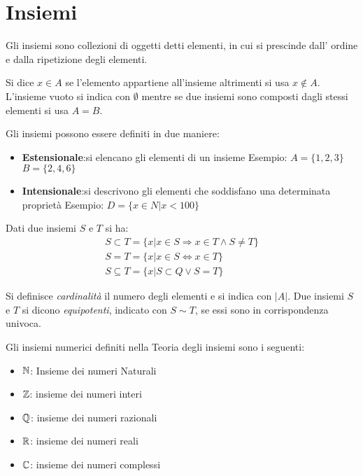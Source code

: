 \chapter{Insiemi}
Gli insiemi sono collezioni di oggetti detti elementi, in cui si prescinde dall'
ordine e dalla ripetizione degli elementi.

Si dice $x \in A$ se l'elemento appartiene all'insieme altrimenti si usa $x \not \in A$.
L'insieme vuoto si indica con $\emptyset$ mentre se due insiemi sono composti dagli stessi
elementi si usa $A = B$.

Gli insiemi possono essere definiti in due maniere:

\begin{itemize}
  \item \textbf{Estensionale}:si elencano gli elementi di un insieme\newline
        Esempio:\newline
        $A = \{1,2,3\}$\newline
        $B = \{2,4,6\}$\newline
  \item \textbf{Intensionale}:si descrivono gli elementi che soddisfano una determinata proprietà\newline
        Esempio: \newline
        $D = \{x \in N | x < 100\}$
\end{itemize}

Dati due insiemi $S$ e $T$ si ha:
\begin{align*}
  S \subset T = \{x | x \in S \Rightarrow x \in T \land S \not = T \} \\
  S = T  = \{x | x \in S \iff x \in T \} \\
  S \subseteq T = \{x | S \subset Q \lor S = T \}
\end{align*}


Si definisce \textit{cardinalità} il numero degli elementi e si indica con $|A|$.\newline
Due insiemi $S$ e $T$ si dicono \textit{equipotenti}, indicato con $S \sim T$, se
essi sono in corrispondenza univoca.

Gli insiemi numerici definiti nella Teoria degli insiemi sono i seguenti: \newline
\begin{itemize}
  \item $\mathbb{N}$: Insieme dei numeri Naturali
  \item $\mathbb{Z}$: insieme dei numeri interi
  \item $\mathbb{Q}$: insieme dei numeri razionali
  \item $\mathbb{R}$: insieme dei numeri reali
  \item $\mathbb{C}$: insieme dei numeri complessi
\end{itemize}

